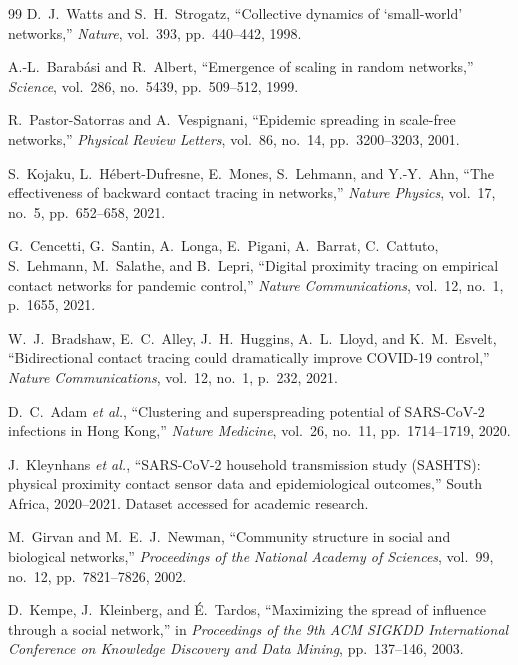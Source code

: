 \documentclass[12pt,a4paper]{report}
\theoremstyle{definition}
\begin{document}
\begin{thebibliography}{99}
    D.~J.~Watts and S.~H.~Strogatz,
    ``Collective dynamics of `small-world' networks,''
    \textit{Nature}, vol.~393, pp.~440--442, 1998.

    A.-L.~Barabási and R.~Albert,
    ``Emergence of scaling in random networks,''
    \textit{Science}, vol.~286, no.~5439, pp.~509--512, 1999.

    R.~Pastor-Satorras and A.~Vespignani,
    ``Epidemic spreading in scale-free networks,''
    \textit{Physical Review Letters}, vol.~86, no.~14, pp.~3200--3203, 2001.

    S.~Kojaku, L.~Hébert-Dufresne, E.~Mones, S.~Lehmann, and Y.-Y.~Ahn,
    ``The effectiveness of backward contact tracing in networks,''
    \textit{Nature Physics}, vol.~17, no.~5, pp.~652--658, 2021.

    G.~Cencetti, G.~Santin, A.~Longa, E.~Pigani, A.~Barrat, C.~Cattuto,
    S.~Lehmann, M.~Salathe, and B.~Lepri,
    ``Digital proximity tracing on empirical contact networks for pandemic control,''
    \textit{Nature Communications}, vol.~12, no.~1, p.~1655, 2021.

    W.~J.~Bradshaw, E.~C.~Alley, J.~H.~Huggins, A.~L.~Lloyd, and K.~M.~Esvelt,
    ``Bidirectional contact tracing could dramatically improve COVID-19 control,''
    \textit{Nature Communications}, vol.~12, no.~1, p.~232, 2021.

    D.~C.~Adam \textit{et al.},
    ``Clustering and superspreading potential of SARS-CoV-2 infections in Hong Kong,''
    \textit{Nature Medicine}, vol.~26, no.~11, pp.~1714--1719, 2020.

    J.~Kleynhans \textit{et al.},
    ``SARS-CoV-2 household transmission study (SASHTS): physical proximity contact sensor data and epidemiological outcomes,''
    South Africa, 2020--2021. Dataset accessed for academic research.

    M.~Girvan and M.~E.~J.~Newman,
    ``Community structure in social and biological networks,''
    \textit{Proceedings of the National Academy of Sciences},
    vol.~99, no.~12, pp.~7821--7826, 2002.

    D.~Kempe, J.~Kleinberg, and É.~Tardos,
    ``Maximizing the spread of influence through a social network,''
    in \textit{Proceedings of the 9th ACM SIGKDD International Conference on Knowledge Discovery and Data Mining},
    pp.~137--146, 2003.


\end{thebibliography}
\end{document}
